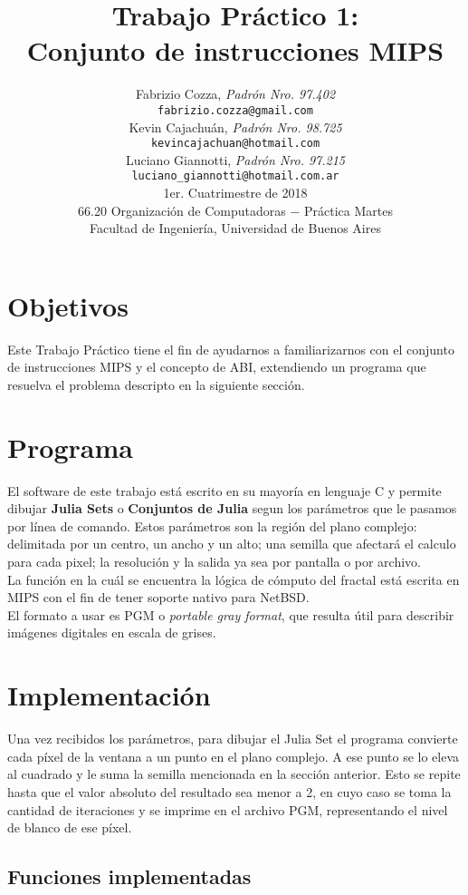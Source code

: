 \documentclass[a4paper,10pt]{article}
\title{		\textbf{Trabajo Práctico 1: \\
			Conjunto de instrucciones MIPS
			}}
\author{	Fabrizio Cozza, \textit{Padrón Nro. 97.402}                     \\
            \texttt{ fabrizio.cozza@gmail.com }                                              \\[2.5ex]
            Kevin Cajachuán, \textit{Padrón Nro. 98.725}                     \\
            \texttt{ kevincajachuan@hotmail.com }                                              \\[2.5ex]
            Luciano Giannotti, \textit{Padrón Nro. 97.215}                     \\
            \texttt{luciano\_giannotti@hotmail.com.ar}                                              \\[3.5ex]
	 \newline
            \normalsize{1er. Cuatrimestre de 2018}                                      \\
            \normalsize{66.20 Organización de Computadoras  $-$ Práctica Martes}  \\
            \normalsize{Facultad de Ingeniería, Universidad de Buenos Aires}            \\
       }
\date{}
\begin{document}
\maketitle
\thispagestyle{empty}   %
\newpage

\section{Objetivos}

Este Trabajo Práctico tiene el fin de ayudarnos a familiarizarnos con el conjunto de instrucciones MIPS y el concepto de ABI, extendiendo un programa que resuelva el problema descripto en la siguiente sección.


\section{Programa}

El software de este trabajo está escrito en su mayoría en lenguaje C y permite dibujar \textbf{Julia Sets} o \textbf{Conjuntos de Julia} segun los parámetros que le pasamos por línea de comando.
Estos parámetros son la región del plano complejo: delimitada por un centro, un ancho y un alto; una semilla que afectará el calculo para cada pixel; la resolución y la salida ya sea por pantalla o por archivo. \\
La función en la cuál se encuentra la lógica de cómputo del fractal está escrita en MIPS con el fin de tener soporte nativo para NetBSD. \\
El formato a usar es  PGM o \textit{portable gray format}, que resulta útil para describir imágenes digitales en escala de grises.


\section{Implementación}

Una vez recibidos los parámetros, para dibujar el Julia Set el programa convierte cada píxel de la ventana a un punto en el plano complejo.
A ese punto se lo eleva al cuadrado y le suma la semilla mencionada en la sección anterior. Esto se repite hasta que el valor absoluto del resultado sea menor a 2, en cuyo caso se toma la cantidad de iteraciones y se imprime en el archivo PGM, representando el nivel de blanco de ese píxel.

\subsection{Funciones implementadas}
\end{document}

